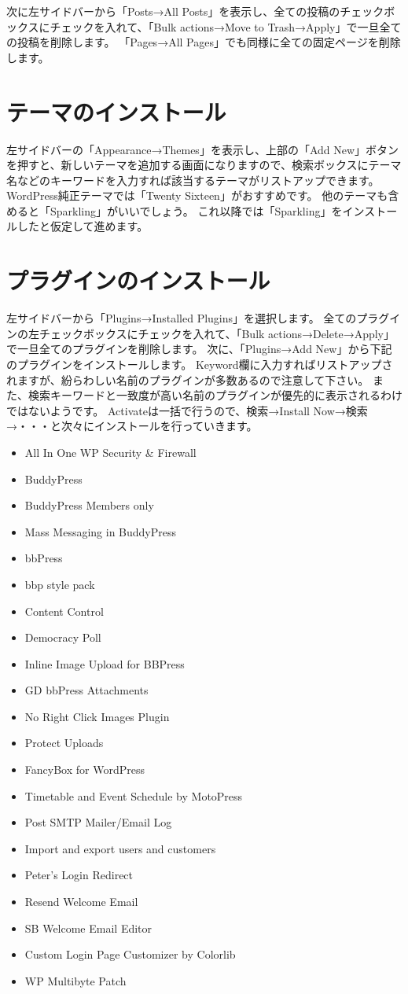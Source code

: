 \documentclass[titlepage,10pt,a4paper,uplatex]{jsbook}
\begin{document}
次に左サイドバーから「Posts→All Posts」を表示し、全ての投稿のチェックボックスにチェックを入れて、「Bulk actions→Move to Trash→Apply」で一旦全ての投稿を削除します。
「Pages→All Pages」でも同様に全ての固定ページを削除します。

\section{テーマのインストール}

左サイドバーの「Appearance→Themes」を表示し、上部の「Add New」ボタンを押すと、新しいテーマを追加する画面になりますので、検索ボックスにテーマ名などのキーワードを入力すれば該当するテーマがリストアップできます。
WordPress純正テーマでは「Twenty Sixteen」がおすすめです。
他のテーマも含めると「Sparkling」がいいでしょう。
これ以降では「Sparkling」をインストールしたと仮定して進めます。

\section{プラグインのインストール}

左サイドバーから「Plugins→Installed Plugins」を選択します。
全てのプラグインの左チェックボックスにチェックを入れて、「Bulk actions→Delete→Apply」で一旦全てのプラグインを削除します。
次に、「Plugins→Add New」から下記のプラグインをインストールします。
Keyword欄に入力すればリストアップされますが、紛らわしい名前のプラグインが多数あるので注意して下さい。
また、検索キーワードと一致度が高い名前のプラグインが優先的に表示されるわけではないようです。
Activateは一括で行うので、検索→Install Now→検索→・・・と次々にインストールを行っていきます。

\begin{itemize}
\item All In One WP Security \& Firewall
\item BuddyPress
\item BuddyPress Members only
\item Mass Messaging in BuddyPress
\item bbPress
\item bbp style pack
\item Content Control
\item Democracy Poll
\item Inline Image Upload for BBPress
\item GD bbPress Attachments
\item No Right Click Images Plugin
\item Protect Uploads
\item FancyBox for WordPress
\item Timetable and Event Schedule by MotoPress
\item Post SMTP Mailer/Email Log
\item Import and export users and customers
\item Peter's Login Redirect
\item Resend Welcome Email
\item SB Welcome Email Editor
\item Custom Login Page Customizer by Colorlib
\item WP Multibyte Patch
\end{itemize}
\end{document}

